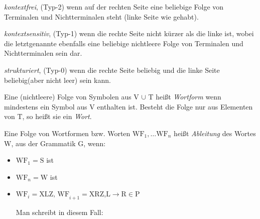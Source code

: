 \documentclass[11pt, a4paper]{article}
\begin{document}
\begin{flushleft}
\begin{tcolorbox}[title = Definition 1.6]
\begin{description}
                \item\emph{kontextfrei}, (Typ-2) wenn auf der rechten Seite eine beliebige Folge von Terminalen und Nichtterminalen steht (linke Seite wie gehabt).

                \item\emph{kontextsensitiv}, (Typ-1) wenn die rechte Seite nicht kürzer als die linke ist, wobei die letztgenannte ebenfalls eine beliebige nichtleere Folge von Terminalen und Nichtterminalen sein dar.

                \item\emph{strukturiert}, (Typ-0) wenn die rechte Seite beliebig und die linke Seite beliebig(aber nicht leer) sein kann.
        \end{description}
    \end{tcolorbox}

    \begin{tcolorbox}[title = Beispiel 1.4, colbacktitle = white, coltitle = black, colframe = black, colback = white, fonttitle = \bfseries]



    \end{tcolorbox}

    \begin{tcolorbox}[title = Definition 1.7]
        Eine (nichtleere) Folge von Symbolen aus V \(\cup\) T heißt \emph{Wortform} wenn mindestens ein Symbol aus V enthalten ist. Besteht die Folge nur aus Elementen von T, so heißt sie ein \emph{Wort}.
    \end{tcolorbox}

    \begin{tcolorbox}[title = Definition 1.8]
        Eine Folge von Wortformen bzw. Worten \(\text{WF}_1, \ldots \text{WF}_n\) heißt \emph{Ableitung} des Wortes W, aus der Grammatik G, wenn:
        \begin{itemize}[-]
            \item \(\text{WF}_1 = \text{S}\) ist

            \item \(\text{WF}_n = \text{W}\) ist

            \item
                  \begin{flushleft}
                      \(\text{WF}_i = \text{XLZ, WF}_{i+1} = \text{XRZ}\),\linebreak \(\text{L} \rightarrow \text{R} \in \text{P}\)

                      Man schreibt in diesem Fall:


\end{flushleft}
\end{itemize}
\end{tcolorbox}
\end{flushleft}
\end{document}
